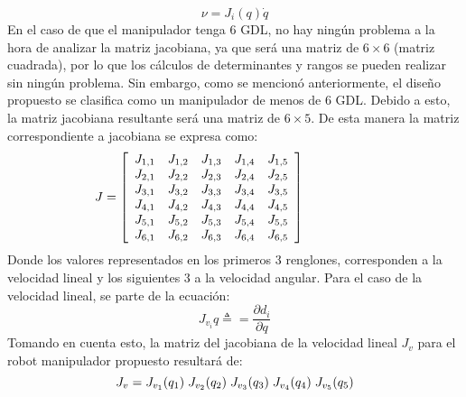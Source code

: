     \begin{equation*}
        \nu = J_i (q)\dot{q}
    \end{equation*}
    En el caso de que el manipulador tenga 6 GDL, no hay ningún problema a la hora de analizar la matriz jacobiana,
    ya que será una matriz de $ 6 \times  6 $ (matriz cuadrada), por lo que los cálculos de determinantes y rangos
    se pueden realizar sin ningún problema. Sin embargo, como se mencionó anteriormente, el diseño propuesto se
    clasifica como un manipulador de menos de 6 GDL. Debido a esto, la matriz jacobiana resultante será una matriz
    de $ 6 \times 5 $.
    \vspace{2mm}
    De esta manera la matriz correspondiente a jacobiana se expresa como:
    \begin{equation*}
        \hspace{-10mm}
        J = \left[
            \begin{array}{ccccc}
                J_{1,1} & J_{1,2} & J_{1,3} & J_{1,4} & J_{1,5}\\
                J_{2,1} & J_{2,2} & J_{2,3} & J_{2,4} & J_{2,5}\\
                J_{3,1} & J_{3,2} & J_{3,3} & J_{3,4} & J_{3,5}\\
                J_{4,1} & J_{4,2} & J_{4,3} & J_{4,4} & J_{4,5}\\
                J_{5,1} & J_{5,2} & J_{5,3} & J_{5,4} & J_{5,5}\\
                J_{6,1} & J_{6,2} & J_{6,3} & J_{6,4} & J_{6,5}\\
            \end{array}\right] 
        \hspace{10mm}
    \end{equation*} 
    Donde los valores representados en los primeros 3 renglones, corresponden a la velocidad lineal y los siguientes
    3 a la velocidad angular. 
    Para el caso de la velocidad lineal, se parte de la ecuación:
    \begin{equation*}
        J_{v_i} q \triangleq = \frac{\partial d_i}{\partial q}
    \end{equation*}
    Tomando en cuenta esto, la matriz del jacobiana de la velocidad lineal $J_{v}$ para el robot manipulador propuesto
    resultará de:
    \begin{equation*}
        J_v = J_{v_1}(q_1) \hspace{1mm} J_{v_2}(q_2) \hspace{1mm} J_{v_3}(q_3) \hspace{1mm} J_{v_4}(q_4) \hspace{1mm} J_{v_5}(q_5)
    \end{equation*}
